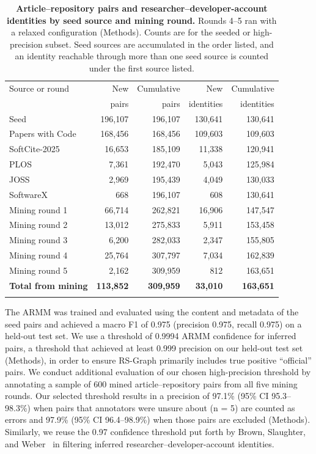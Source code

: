 \documentclass[pdflatex,sn-nature]{sn-jnl}%
\begin{document}
\begin{table}[ht]
\caption{\textbf{Article--repository pairs and researcher--developer-account identities by seed source and mining round.} Rounds 4--5 ran with a relaxed configuration (Methods). Counts are for the seeded or high-precision subset. Seed sources are accumulated in the order listed, and an identity reachable through more than one seed source is counted under the first source listed.}\label{tab:mining}
\begin{tabular}{@{}lrrrr@{}}
\toprule
Source or round & New & Cumulative & New & Cumulative \\
 & pairs & pairs & identities & identities \\
\midrule
Seed & 196,107 & 196,107 & 130,641 & 130,641 \\
\quad Papers with Code & 168,456 & 168,456 & 109,603 & 109,603 \\
\quad SoftCite-2025 & 16,653 & 185,109 & 11,338 & 120,941 \\
\quad PLOS & 7,361 & 192,470 & 5,043 & 125,984 \\
\quad JOSS & 2,969 & 195,439 & 4,049 & 130,033 \\
\quad SoftwareX & 668 & 196,107 & 608 & 130,641 \\
Mining round 1 & 66,714 & 262,821 & 16,906 & 147,547 \\
Mining round 2 & 13,012 & 275,833 & 5,911 & 153,458 \\
Mining round 3 & 6,200 & 282,033 & 2,347 & 155,805 \\
Mining round 4 & 25,764 & 307,797 & 7,034 & 162,839 \\
Mining round 5 & 2,162 & 309,959 & 812 & 163,651 \\
\midrule
\textbf{Total from mining} & \textbf{113,852} & \textbf{309,959} & \textbf{33,010} & \textbf{163,651} \\
\botrule
\end{tabular}
\end{table}

The ARMM was trained and evaluated using the content and metadata of the seed pairs and achieved a macro F1 of 0.975 (precision 0.975, recall 0.975) on a held-out test set. We use a threshold of 0.9994 ARMM confidence for inferred pairs, a threshold that achieved at least 0.999 precision on our held-out test set (Methods), in order to ensure RS-Graph primarily includes true positive ``official'' pairs. We conduct additional evaluation of our chosen high-precision threshold by annotating a sample of 600 mined article--repository pairs from all five mining rounds. Our selected threshold results in a precision of 97.1\% (95\% CI 95.3--98.3\%) when pairs that annotators were unsure about (n = 5) are counted as errors and 97.9\% (95\% CI 96.4--98.9\%) when those pairs are excluded (Methods). Similarly, we reuse the 0.97 confidence threshold put forth by Brown, Slaughter, and Weber~\cite{brown2026code} in filtering inferred researcher--developer-account identities.
\end{document}
